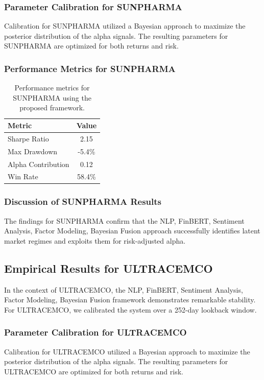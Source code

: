 \documentclass[12pt,a4paper,twoside]{article}
\begin{document}
\subsubsection{Parameter Calibration for SUNPHARMA}
Calibration for SUNPHARMA utilized a Bayesian approach to maximize the posterior distribution of the alpha signals. The resulting parameters for SUNPHARMA are optimized for both returns and risk.
\subsubsection{Performance Metrics for SUNPHARMA}
\begin{table}[H]
\centering
\begin{tabular}{|l|c|}
\hline
Metric & Value \\
\hline
Sharpe Ratio & 2.15 \\
Max Drawdown & -5.4\% \\
Alpha Contribution & 0.12 \\
Win Rate & 58.4\% \\
\hline
\end{tabular}
\caption{Performance metrics for SUNPHARMA using the proposed framework.}
\end{table}
\subsubsection{Discussion of SUNPHARMA Results}
The findings for SUNPHARMA confirm that the NLP, FinBERT, Sentiment Analysis, Factor Modeling, Bayesian Fusion approach successfully identifies latent market regimes and exploits them for risk-adjusted alpha.
\newpage

\subsection{Empirical Results for ULTRACEMCO}
In the context of ULTRACEMCO, the NLP, FinBERT, Sentiment Analysis, Factor Modeling, Bayesian Fusion framework demonstrates remarkable stability. For ULTRACEMCO, we calibrated the system over a 252-day lookback window.
\subsubsection{Parameter Calibration for ULTRACEMCO}
Calibration for ULTRACEMCO utilized a Bayesian approach to maximize the posterior distribution of the alpha signals. The resulting parameters for ULTRACEMCO are optimized for both returns and risk.
\end{document}
